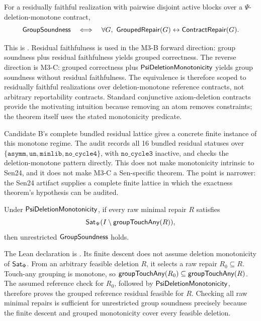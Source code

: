 \begin{corollary}[Exactness]
\label{cor:exactness}
For a residually faithful realization with pairwise disjoint active blocks over
a \(\Psi\)-deletion-monotone contract,
\[
  \mathsf{GroupSoundness}
  \quad\Longleftrightarrow\quad
  \forall G,\
  \mathsf{GroupedRepair}(G)\leftrightarrow\mathsf{ContractRepair}(G).
\]
\end{corollary}

This is .  Residual faithfulness is used in the M3-B
forward direction: group soundness plus residual faithfulness yields grouped
correctness.  The reverse direction is M3-C: grouped correctness plus
\(\mathsf{PsiDeletionMonotonicity}\) yields group soundness without residual
faithfulness.  The equivalence is therefore scoped to residually faithful
realizations over deletion-monotone reference contracts, not arbitrary
reportability contracts.  Standard conjunctive axiom-deletion contracts
provide the motivating intuition because removing an atom removes
constraints; the theorem itself uses the stated monotonicity predicate.

Candidate B's complete bundled residual lattice gives a concrete finite
instance of this monotone regime.  The audit records all 16 bundled residual
statuses over
\(\{\mathtt{asymm},\mathtt{un},\mathtt{minlib},\mathtt{no\_cycle4}\}\), with
\(\mathtt{no\_cycle3}\) inactive, and checks the deletion-monotone pattern
directly.  This does not make monotonicity intrinsic to Sen24, and it does not
make M3-C a Sen-specific theorem.  The point is narrower: the Sen24 artifact
supplies a complete finite lattice in which the exactness theorem's hypothesis
can be audited.

\begin{proposition}
\label{prop:audit-collapse}
Under \(\mathsf{PsiDeletionMonotonicity}\), if every raw minimal repair \(R\) satisfies
\[
  \mathsf{Sat}_{\Psi}(I\setminus\mathsf{groupTouchAny}(R)),
\]
then unrestricted \(\mathsf{GroupSoundness}\) holds.
\end{proposition}

The Lean declaration is .  Its finite descent does
not assume deletion monotonicity of \(\mathsf{Sat}_{\Phi}\).  From an arbitrary feasible
deletion \(R\), it selects a raw repair \(R_0\subseteq R\).  Touch-any grouping
is monotone, so
\(\mathsf{groupTouchAny}(R_0)\subseteq\mathsf{groupTouchAny}(R)\).  The assumed reference
check for \(R_0\), followed by \(\mathsf{PsiDeletionMonotonicity}\), therefore proves
the grouped reference residual feasible for \(R\).  Checking all raw minimal
repairs is sufficient for unrestricted group soundness precisely because the
finite descent and grouped monotonicity cover every feasible deletion.

